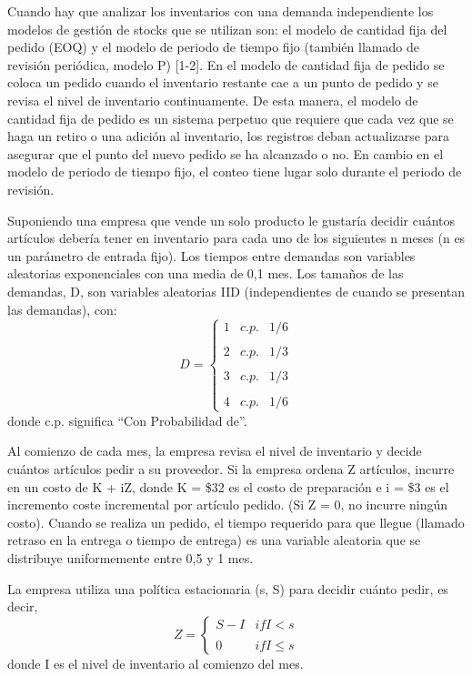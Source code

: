 Cuando hay que analizar los inventarios con una demanda independiente los modelos de
gestión de stocks que se utilizan son: el modelo de cantidad fija del pedido (EOQ) y el
modelo de periodo de tiempo fijo (también llamado de revisión periódica, modelo P) [1-2].
En el modelo de cantidad fija de pedido se coloca un pedido cuando el inventario restante cae a
un punto de pedido y se revisa el nivel de inventario continuamente.
De esta manera, el modelo de cantidad fija de pedido es un sistema perpetuo que requiere que cada
vez que se haga un retiro o una adición al inventario, los registros deban actualizarse para
asegurar que el punto del nuevo pedido se ha alcanzado o no.
En cambio en el modelo de periodo de
tiempo fijo, el conteo tiene lugar solo durante el periodo de revisión.

Suponiendo una empresa que vende un solo producto le gustaría decidir cuántos artículos debería
tener en inventario para cada uno de los siguientes n meses (n es un parámetro de entrada fijo).
Los tiempos entre demandas son variables aleatorias exponenciales con una media de 0,1 mes.
Los tamaños de las demandas, D, son variables aleatorias IID (independientes de cuando se presentan
las demandas), con:
\begin{equation}
  \label{eq:equation9}
  D=\left\{ \begin{array}{lcc}
            1 &   c.p.  & 1/6 \\
            \\ 2 &  c.p. & 1/3 \\
            \\ 3 &  c.p. & 1/3 \\
            \\ 4 &  c.p.  & 1/6
  \end{array}
  \right.
\end{equation}
donde c.p. significa ``Con Probabilidad de''.

Al comienzo de cada mes, la empresa revisa el nivel de inventario y decide cuántos artículos pedir
a su proveedor.
Si la empresa ordena Z artículos, incurre en un costo de K + iZ, donde K = \$32 es el costo de
preparación e i = \$3 es el incremento coste incremental por artículo pedido.
(Si Z = 0, no incurre ningún costo).
Cuando se realiza un pedido, el tiempo requerido para que llegue (llamado retraso en la entrega
o tiempo de entrega) es una variable aleatoria que se distribuye uniformemente entre 0,5 y 1 mes.

La empresa utiliza una política estacionaria (s, S) para decidir cuánto pedir, es decir,
\begin{equation}
  \label{eq:equation10}
  Z = \left\{ \begin{array}{lcc}
                S-I & if I < s \\
                \\ 0 & if I \leq s
  \end{array}
  \right.
\end{equation}
donde I es el nivel de inventario al comienzo del mes.

